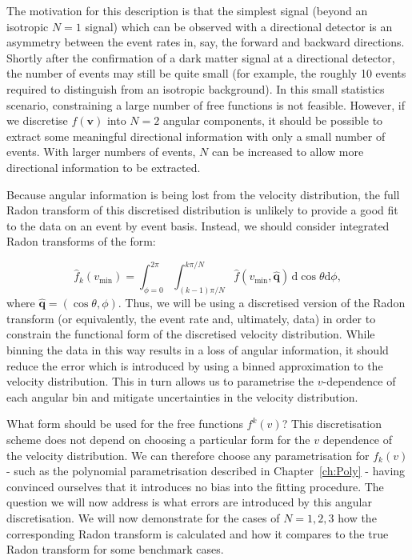 The motivation for this description is that the simplest signal (beyond an isotropic $N=1$ signal) which can be observed with a directional detector is an asymmetry between the event rates in, say, the forward and backward directions. Shortly after the confirmation of a dark matter signal at a directional detector, the number of events may still be quite small (for example, the roughly 10 events required to distinguish from an isotropic background). In this small statistics scenario, constraining a large number of free functions is not feasible. However, if we discretise $f(\textbf{v})$ into $N=2$ angular components, it should be possible to extract some meaningful directional information with only a small number of events. With larger numbers of events, $N$ can be increased to allow more directional information to be extracted.

Because angular information is being lost from the velocity distribution, the full Radon transform of this discretised distribution is unlikely to provide a good fit to the data on an event by event basis. Instead, we should consider integrated Radon transforms of the form:

\begin{equation}
\hat{f}_k(v_\textrm{min}) = \int_{\phi = 0}^{2\pi} \int_{(k-1)\pi/N}^{k\pi/N} \hat{f}(v_\textrm{min}, \hat{\textbf{q}})\, \mathrm{d}\cos\theta\mathrm{d}\phi,
\end{equation}
 where $\hat{\textbf{q}} = (\cos\theta, \phi)$. Thus, we will be using a discretised version of the Radon transform (or equivalently, the event rate and, ultimately, data) in order to constrain the functional form of the discretised velocity distribution. While binning the data in this way results in a loss of angular information, it should reduce the error which is introduced by using a binned approximation to the velocity distribution. This in turn allows us to parametrise the $v$-dependence of each angular bin and mitigate uncertainties in the velocity distribution.

What form should be used for the free functions $f^k(v)$? This discretisation scheme does not depend on choosing a particular form for the $v$ dependence of the velocity distribution. We can therefore choose any parametrisation for $f_k(v)$ - such as the polynomial parametrisation described in Chapter~\ref{ch:Poly} - having convinced ourselves that it introduces no bias into the fitting procedure. The question we will now address is what errors are introduced by this angular discretisation. We will now demonstrate for the cases of $N=1, 2, 3$ how the corresponding Radon transform is calculated and how it compares to the true Radon transform for some benchmark cases.


